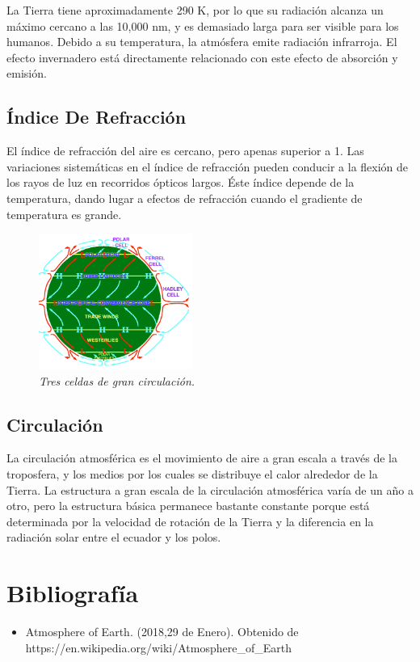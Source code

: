 \documentclass[12pt]{article}
\begin{document}
 La Tierra tiene aproximadamente 290 K, por lo que su radiación alcanza un máximo cercano a las 10,000 nm, y es demasiado larga para ser visible para los humanos. Debido a su temperatura, la atmósfera emite radiación infrarroja. El efecto invernadero está directamente relacionado con este efecto de absorción y emisión.
 
\subsection{Índice De Refracción}
El índice de refracción del aire es cercano, pero apenas superior a 1. Las variaciones sistemáticas en el índice de refracción pueden conducir a la flexión de los rayos de luz en recorridos ópticos largos. Éste índice depende de la temperatura, dando lugar a efectos de refracción cuando el gradiente de temperatura es grande.\\
\begin{figure} 
\includegraphics[width=0.45\textwidth]{circ.png}
\caption{\textit{Tres celdas de gran circulación.}}
\end{figure}
\subsection{Circulación}
La circulación atmosférica es el movimiento de aire a gran escala a través de la troposfera, y los medios por los cuales se distribuye el calor alrededor de la Tierra. La estructura a gran escala de la circulación atmosférica varía de un año a otro, pero la estructura básica permanece bastante constante porque está determinada por la velocidad de rotación de la Tierra y la diferencia en la radiación solar entre el ecuador y los polos.

\section{Bibliografía}
\begin{itemize}
\item Atmosphere of Earth. (2018,29 de Enero). Obtenido de 						 https://en.wikipedia.org/wiki/Atmosphere\_of\_Earth
\end{itemize}
\end{document}
